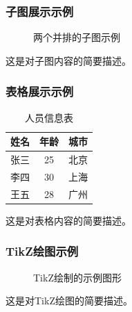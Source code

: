 \documentclass[10pt]{beamer}
\begin{document}
\begin{frame}
\frametitle{子图展示示例}
\begin{figure}
\centering
{}
\hfill
{}
\caption{两个并排的子图示例}
\label{fig:subfigures}
\end{figure}
这是对子图内容的简要描述。
\end{frame}

\begin{frame}
\frametitle{表格展示示例}
\begin{table}
\centering
\begin{tabular}{|c|c|c|}
\hline
姓名 & 年龄 & 城市 \\
\hline
张三 & 25 & 北京 \\
李四 & 30 & 上海 \\
王五 & 28 & 广州 \\
\hline
\end{tabular}
\caption{人员信息表}
\end{table}
这是对表格内容的简要描述。
\end{frame}

\begin{frame}
\frametitle{TikZ绘图示例}
\begin{figure}
\centering
{}
\caption{TikZ绘制的示例图形}
\end{figure}
这是对TikZ绘图的简要描述。
\end{frame}
\end{document}
